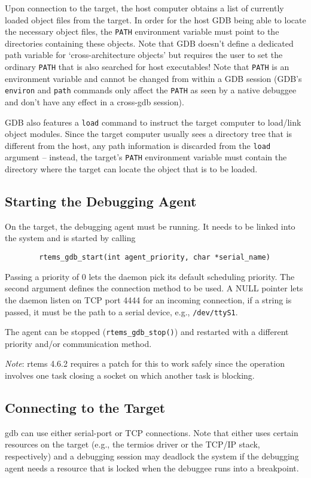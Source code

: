\documentclass{article}
\newcommand{\cmd}[1]{{\tt #1}}
\begin{document}
	Upon connection to the target, the host computer obtains
	a list of currently loaded object files from the target.
	In order for the host GDB being able to locate the necessary
	object files, the {\tt PATH} environment variable must point to
	the directories containing these objects. Note that GDB
	doesn't define a dedicated path variable for `cross-architecture
	objects' but requires the user to set the ordinary {\tt PATH}
	that is also searched for host executables!
	Note that {\tt PATH} is an environment variable and cannot be
	changed from within a GDB session (GDB's \cmd{environ} and \cmd{path}
	commands only affect the {\tt PATH} as seen by a native debuggee
	and don't have any effect in a cross-gdb session).

	GDB also features a \cmd{load} command to instruct the target
	computer to load/link object modules. Since the target
	computer usually sees a directory tree that is different
	from the host, any path information is discarded from the
	\cmd{load} argument -- instead, the target's {\tt PATH} environment
	variable must contain the directory where the target can
	locate the object that is to be loaded.

\subsection{Starting the Debugging Agent}
	On the target, the debugging agent must be running.
	It needs to be linked into the system and is started
	by calling
\begin{verbatim}
		rtems_gdb_start(int agent_priority, char *serial_name)
\end{verbatim}

	Passing a priority of 0 lets the daemon pick its default
	scheduling priority. The second argument defines the
	connection method to be used. A NULL pointer lets the
	daemon listen on TCP port 4444 for an incoming connection,
	if a string is passed, it must be the path to a serial
	device, e.g., {\tt /dev/ttyS1}.

	The agent can be stopped (\verb|rtems_gdb_stop()|) and restarted
	with a different priority and/or communication method.

	{\em Note\/}: rtems 4.6.2 requires a patch for this to work safely
	since the operation involves one task closing a socket
	on which another task is blocking.

\subsection{Connecting to the Target}
	gdb can use either serial-port or TCP connections. Note
	that either uses certain resources on the target (e.g.,
	the termios driver or the TCP/IP stack, respectively)
	and a debugging session may deadlock the system if
	the debugging agent needs a resource that is locked
	when the debuggee runs into a breakpoint.
\end{document}
